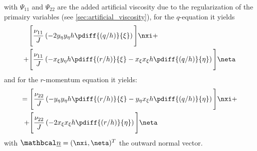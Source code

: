 with $\Psi_{11}$ and $\Psi_{22}$ are the added artificial viscosity due to the regularization of the primairy variables (see \autoref{sec:artificial_viscosity}), for the $q$-equation it yields
%
\begin{align}
    \Bigg[ &  \frac{\nu_{11}}{J} \left(
    - 2 y_{\eta} y_{\eta} h \pdiff{(q/h)}{\xi}
    \right)
    \Bigg] \nxi +
    \\*
    + \Bigg[ &
    \frac{\nu_{11}}{J} \left(
    - x_{\xi}y_{\eta} h \pdiff{(r/h)}{\xi}
    - x_{\xi}x_{\xi} h \pdiff{(q/h)}{\eta}
    \right)
    \Bigg] \neta
\end{align}
and for the $r$-momentum equation it yields:
\begin{align}
    = \Bigg[
    & \frac{\nu_{22}}{J} \left(
    - y_{\eta} y_{\eta} h \pdiff{(r/h)}{\xi}
    - y_{\eta} x_{\xi} h \pdiff{(q/h)}{\eta}
    \right)
    \Bigg] \nxi +
    \\
    + \Bigg[ &
    \frac{\nu_{22}}{J} \left(
    - 2 x_{\xi}x_{\xi} h \pdiff{(r/h)}{\eta}
    \right)
    \Bigg] \neta
\end{align}
with $\vecn = (\nxi, \neta)^T$ the outward normal vector.
